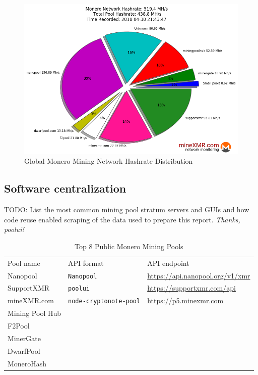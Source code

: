 \documentclass[notitlepage]{report}
\begin{document}
\begin{figure}[h]
\centering
\includegraphics[width=\textwidth]{global-monero-mining-network-hashrate-distribution-2018-04-30}
\captionsetup{labelformat=empty}
\caption{Global Monero Mining Network Hashrate Distribution}
\label{fig:hashrate-distribution}
\end{figure}

\subsection{Software centralization}

TODO: List the most common mining pool stratum servers and GUIs and how code reuse enabled scraping of the data used to prepare this report.  \textit{Thanks, poolui!}


\begin{table}[h]
\centering
\caption{Top 8 Public Monero Mining Pools}
\begin{tabular}{lll}
Pool name       & API format                  & API endpoint                          \\
Nanopool        & \verb/Nanopool/             & \url{https://api.nanopool.org/v1/xmr} \\
SupportXMR      & \verb/poolui/               & \url{https://supportxmr.com/api}      \\
mineXMR.com     & \verb/node-cryptonote-pool/ & \url{https://p5.minexmr.com}          \\
Mining Pool Hub &                             &                                       \\
F2Pool          &                             &                                       \\
MinerGate       &                             &                                       \\
DwarfPool       &                             &                                       \\
MoneroHash      &                             &                                 
\end{tabular}
\label{table:top-8-pools}
\end{table}
\end{document}
